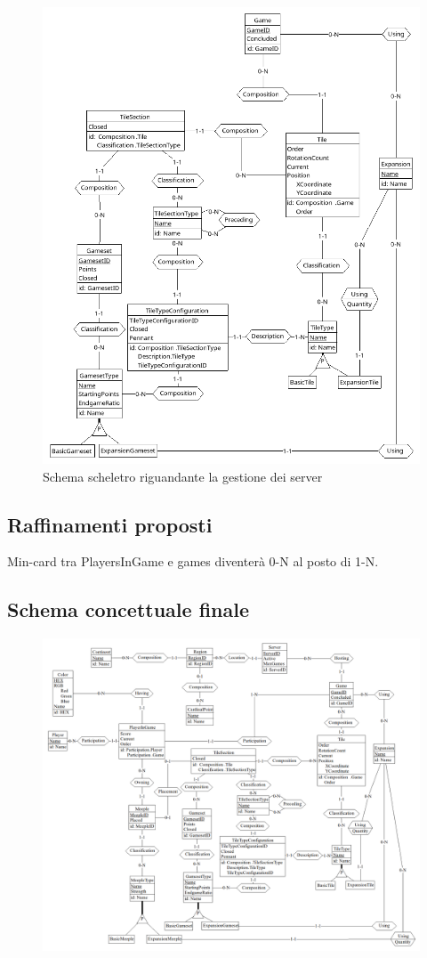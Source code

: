 \begin{figure}[hb]
    \centering\includegraphics[scale=0.24]{images/Progettazione/Concettuale/Scheletro3.png}
    \caption{Schema scheletro riguandante la gestione dei server}
\end{figure}

\subsection{Raffinamenti proposti}
Min-card tra PlayersInGame e games diventerà 0-N al posto di 1-N.
\medskip

\subsection{Schema concettuale finale}
\clearpage
\begin{figure}[ht]
    \centerline{\includegraphics[scale=0.375]{images/Progettazione/Concettuale/modello.png}}
\end{figure}
